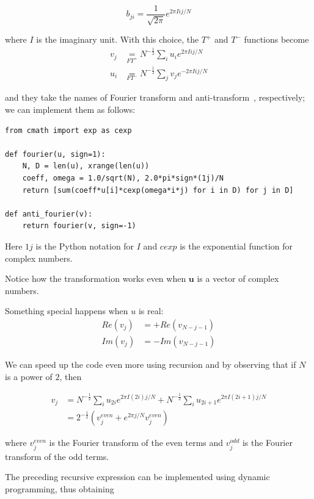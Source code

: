 \documentclass[justified,sixbynine]{tufte-book}
\def\stackunder#1#2{\mathrel{\mathop{#2}\limits_{#1}}}
\theoremstyle{plain}%
\theoremstyle{definition}
\theoremstyle{remark}
\begin{document}
\begin{fullwidth}
\begin{equation}
b_{ji} = \frac{1}{\sqrt{2\pi}} e^{2\pi I ij/N}
\end{equation}

where $I$ is the imaginary unit. With this choice, the $T^+$ and $T^-$ functions become
\begin{align}
\label{fourierd1}
v_j &\stackunder{FT^+}{=} N^{-\frac12} \sum_i u_i e^{2\pi I ij/N} \\
\label{fourierd2}
u_i &\stackunder{FT^-}{=} N^{-\frac12} \sum_j v_j e^{-2\pi I ij/N}
\end{align}

and they take the names of Fourier transform and anti-transform~\cite{fourier}, respectively;
we can implement them as follows:

\begin{lstlisting}
from cmath import exp as cexp

def fourier(u, sign=1):
    N, D = len(u), xrange(len(u))
    coeff, omega = 1.0/sqrt(N), 2.0*pi*sign*(1j)/N
    return [sum(coeff*u[i]*cexp(omega*i*j) for i in D) for j in D]

def anti_fourier(v):
    return fourier(v, sign=-1)
\end{lstlisting}

Here $1j$ is the Python notation for $I$ and $cexp$ is the exponential function for complex numbers.

Notice how the transformation works even when $\mathbf{u}$ is a vector of complex numbers.

Something special happens when $u$ is real:
\begin{align}
Re(v_j) &= +Re(v_{N-j-1}) \\
Im(v_j) &= -Im(v_{N-j-1})
\end{align}

We can speed up the code even more using recursion and by observing that if $N$ is a power of $2$, then

\begin{align}
  v_j &= N^{-\frac12} \sum_i u_{2i} e^{2\pi I (2i)j/N} + N^{-\frac12} \sum_i u_{2i+1} e^{2\pi I (2i+1)j/N} \\
      &= 2^{-\frac12} ( v_j^{even} + e^{2\pi j/N} v_j^{even} )
\end{align}

where $v_j^{even}$ is the Fourier transform of the even terms and $v_j^{odd}$ is the Fourier transform of the odd terms.

The preceding recursive expression can be implemented using dynamic programming, thus obtaining



\end{fullwidth}
\end{document}
